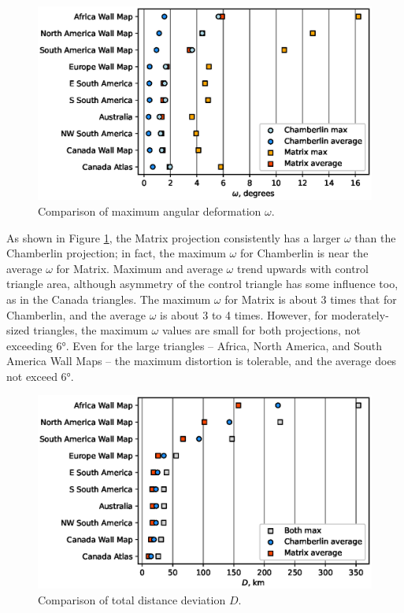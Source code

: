 \documentclass[]{interact}
\begin{document}
\begin{figure}
  \includegraphics[width=\textwidth]{omegaplot}
  \caption{Comparison of maximum angular deformation $\omega$.}
  \label{fig:omegap}
\end{figure}

As shown in Figure \ref{fig:omegap}, the Matrix projection consistently has a
larger $\omega$ than the Chamberlin projection; in fact, the maximum $\omega$
for Chamberlin is near the average $\omega$ for Matrix. Maximum and average
$\omega$ trend upwards with control triangle area, although asymmetry of the
control triangle has some influence too, as in the Canada triangles. The
maximum $\omega$ for Matrix is about 3 times that for Chamberlin, and the
average $\omega$ is about 3 to 4 times. However, for moderately-sized triangles,
the maximum $\omega$ values are small for both projections, not exceeding 6°.
Even for the large triangles -- Africa, North America, and South America Wall
Maps -- the maximum distortion is tolerable, and the average does not exceed 6°.

\begin{figure}
  \includegraphics[width=\textwidth]{distanceplot}
  \caption{Comparison of total distance deviation $D$.}
  \label{fig:distancep}
\end{figure}
\end{document}
